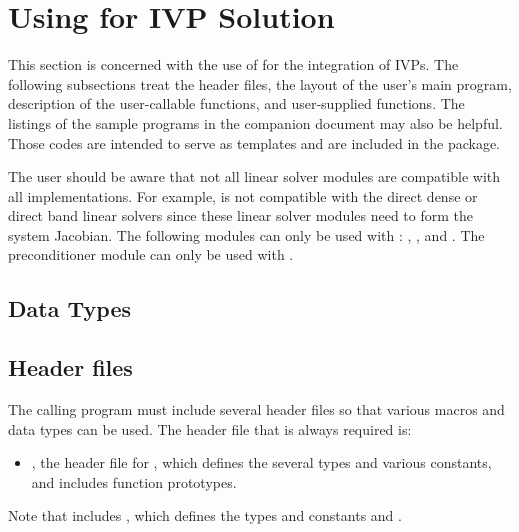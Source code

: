\chapter{Using {\cvodes} for IVP Solution}\label{s:simulation}

This section is concerned with the use of {\cvodes} for the integration of IVPs.
The following subsections treat the header files, the layout of the user's main
program, description of the {\cvodes} user-callable functions, and user-supplied functions. 
The listings of the sample programs in the companion document \cite{} may also be helpful. 
Those codes are intended to serve as templates and are included in the {\cvodes} package.

The user should be aware that not all linear solver modules are compatible 
with all {\nvector} implementations. 
For example, {\nvecp} is not compatible with the direct dense or direct band 
linear solvers since these linear solver modules need to form the system Jacobian.
The following {\cvodes} modules can only be used with {\nvecs}:
{\cvdense}, {\cvband}, and {\cvbandpre}. The preconditioner module {\cvbbdpre}
can only be used with {\nvecp}. 

\section{Data Types}\label{s:types}


\section{Header files}\label{ss:header_sim}

The calling program must include several header files so that various macros
and data types can be used. The header file that is always required is:
\begin{itemize}
\item  {}, 
  the header file for {\cvodes}, which defines the several
  types and various constants, and includes function prototypes.
\end{itemize}
Note that  includes , 
which defines the types 
and constants  and .

